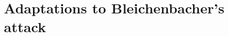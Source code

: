 \documentclass[letterpaper,twocolumn,10pt]{article}
\theoremstyle{plain}
\newif\ifext\extfalse
\begin{document}
\fi

\section{Adaptations to Bleichenbacher's attack}



\ifext
\section{Highly optimized GPU implementation}

\fi

\ifext
\section{Amazon EC2 evaluation}

\fi

\ifext
\section{A brief history of obsolete cryptography}

\fi
\end{document}
